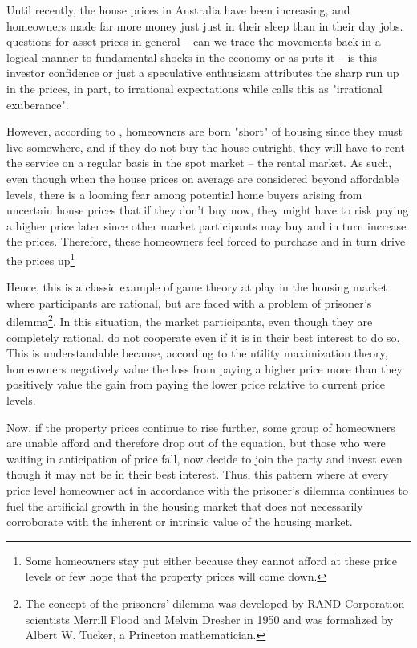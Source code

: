 \documentclass[AEJ,reqno, draftmode]{AEA}
\begin{document}
Until recently, the house prices in Australia have been increasing, and homeowners made far more money just just in their sleep than in their day jobs. \cite{shiller1992market} questions for asset prices in general -- can we trace the movements back in a logical manner to fundamental shocks in the economy or as  \citet{clayton1996rational} puts it -- is this investor confidence or just a speculative enthusiasm \cite{clayton1998further} attributes the sharp run up in the prices, in part, to irrational expectations while \citet{shiller2000irrational} calls this as "irrational exuberance".

However, according to \citet{sinai2005owner}, homeowners are born "short" of housing since they must live somewhere, and if they do not buy the house outright, they will have to rent the service on a regular basis in the spot market -- the rental market. As such, even though when the house prices on average are considered beyond affordable levels, there is a looming fear among potential home buyers arising from uncertain house prices that if they don't buy now, they might have to risk paying a higher price later since other market participants may buy and in turn increase the prices. Therefore, these homeowners feel forced to purchase and in turn drive the prices up\footnote{Some homeowners stay put either because they cannot afford at these price levels or few hope that the property prices will come down.} 

Hence, this is a classic example of game theory at play in the housing market where participants are rational, but are faced with a problem of prisoner's dilemma\footnote{The concept of the prisoners’ dilemma was developed by RAND Corporation scientists Merrill Flood and Melvin Dresher in 1950 and was formalized by Albert W. Tucker, a Princeton mathematician.}. In this situation, the market participants, even though they are completely rational, do not cooperate even if it is in their best interest to do so. This is understandable because, according to the utility maximization theory, homeowners negatively value the loss from paying a higher price more than they positively value the gain from paying the lower price relative to current price levels. 

Now, if the property prices continue to rise further, some group of homeowners are unable afford and therefore drop out of the equation, but those who were waiting in anticipation of price fall, now decide to join the party and invest even though it may not be in their best interest. Thus, this pattern where at every price level homeowner act in accordance with the prisoner's dilemma continues to fuel the artificial growth in the housing market that does not necessarily corroborate with the inherent or intrinsic value of the housing market. 
\end{document}
